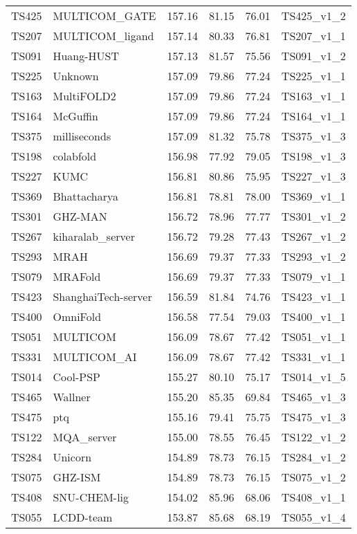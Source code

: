 \begin{longtable}{llllll}
TS425 & MULTICOM\_GATE & 157.16 & 81.15 & 76.01 & TS425\_v1\_2 \\ 
TS207 & MULTICOM\_ligand & 157.14 & 80.33 & 76.81 & TS207\_v1\_1 \\ 
TS091 & Huang-HUST & 157.13 & 81.57 & 75.56 & TS091\_v1\_2 \\ 
TS225 & Unknown & 157.09 & 79.86 & 77.24 & TS225\_v1\_1 \\ 
TS163 & MultiFOLD2 & 157.09 & 79.86 & 77.24 & TS163\_v1\_1 \\ 
TS164 & McGuffin & 157.09 & 79.86 & 77.24 & TS164\_v1\_1 \\ 
TS375 & milliseconds & 157.09 & 81.32 & 75.78 & TS375\_v1\_3 \\ 
TS198 & colabfold & 156.98 & 77.92 & 79.05 & TS198\_v1\_3 \\ 
TS227 & KUMC & 156.81 & 80.86 & 75.95 & TS227\_v1\_3 \\ 
TS369 & Bhattacharya & 156.81 & 78.81 & 78.00 & TS369\_v1\_1 \\ 
TS301 & GHZ-MAN & 156.72 & 78.96 & 77.77 & TS301\_v1\_2 \\ 
TS267 & kiharalab\_server & 156.72 & 79.28 & 77.43 & TS267\_v1\_2 \\ 
TS293 & MRAH & 156.69 & 79.37 & 77.33 & TS293\_v1\_2 \\ 
TS079 & MRAFold & 156.69 & 79.37 & 77.33 & TS079\_v1\_1 \\ 
TS423 & ShanghaiTech-server & 156.59 & 81.84 & 74.76 & TS423\_v1\_1 \\ 
TS400 & OmniFold & 156.58 & 77.54 & 79.03 & TS400\_v1\_1 \\ 
TS051 & MULTICOM & 156.09 & 78.67 & 77.42 & TS051\_v1\_1 \\ 
TS331 & MULTICOM\_AI & 156.09 & 78.67 & 77.42 & TS331\_v1\_1 \\ 
TS014 & Cool-PSP & 155.27 & 80.10 & 75.17 & TS014\_v1\_5 \\ 
TS465 & Wallner & 155.20 & 85.35 & 69.84 & TS465\_v1\_3 \\ 
TS475 & ptq & 155.16 & 79.41 & 75.75 & TS475\_v1\_3 \\ 
TS122 & MQA\_server & 155.00 & 78.55 & 76.45 & TS122\_v1\_2 \\ 
TS284 & Unicorn & 154.89 & 78.73 & 76.15 & TS284\_v1\_2 \\ 
TS075 & GHZ-ISM & 154.89 & 78.73 & 76.15 & TS075\_v1\_2 \\ 
TS408 & SNU-CHEM-lig & 154.02 & 85.96 & 68.06 & TS408\_v1\_1 \\ 
TS055 & LCDD-team & 153.87 & 85.68 & 68.19 & TS055\_v1\_4 \\ 

\end{longtable}
